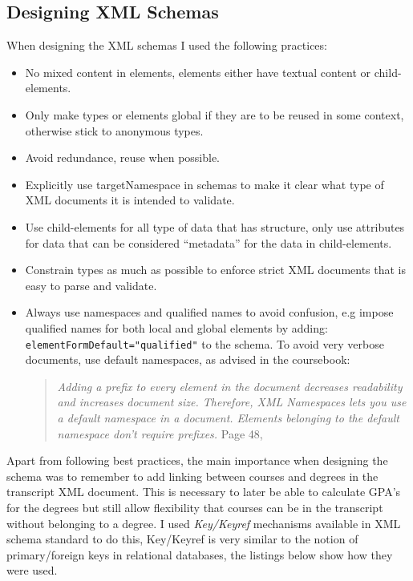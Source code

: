 \documentclass[a4paper, 11pt]{article}
\begin{document}
\subsection*{Designing XML Schemas}
When designing the XML schemas I used the following practices:
\begin{itemize}
\item No mixed content in elements, elements either have textual content or child-elements.
\item Only make types or elements global if they are to be reused in some context, otherwise stick to anonymous types.
\item Avoid redundance, reuse when possible.
\item Explicitly use targetNamespace in schemas to make it clear what type of XML documents it is intended to validate.
\item Use child-elements for all type of data that has structure, only use attributes for data that can be considered ``metadata'' for the data in child-elements.
\item Constrain types as much as possible to enforce strict XML documents that is easy to parse and validate.
\item Always use namespaces and qualified names to avoid confusion, e.g impose qualified names for  both local and global elements by  adding: \texttt{elementFormDefault="qualified"} to the schema. To avoid very verbose documents, use default namespaces, as advised in the coursebook:
  \begin{quote}
    \textit{Adding a prefix to every element in the document decreases readability and increases document size. Therefore, XML Namespaces lets you use a default namespace in a document.
    Elements belonging to the default namespace don't require prefixes.} Page 48, \citep{coursebook}
  \end{quote}
\end{itemize}

Apart from following best practices, the main importance when designing the schema was to remember to add linking between courses and degrees in the transcript XML document.
This is necessary to later be able to calculate GPA's for the degrees but still allow flexibility that courses can be in the transcript without belonging to a degree.
I used \textit{Key/Keyref} mechanisms available in XML schema standard to do this, Key/Keyref is very similar to the notion of primary/foreign keys in relational databases, the listings below
show how they were used.
\end{document}
